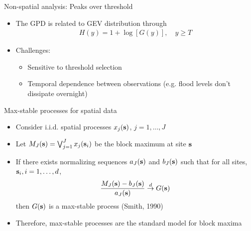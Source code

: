 \documentclass{beamer}
\begin{document}
\begin{frame}{Non-spatial analysis: Peaks over threshold}
  \begin{itemize} \setlength{\itemsep}{1em}
    \item The GPD is related to GEV distribution through
    \begin{align*}
      H(y) = 1 + \log[G(y)], \quad y \ge T
    \end{align*}
    \item Challenges: \vspace{0.5em}
    \begin{itemize} \setlength{\itemsep}{0.5em}
      \item Sensitive to threshold selection
      \item Temporal dependence between observations (e.g. flood levels don't dissipate overnight)
    \end{itemize}
  \end{itemize}
\end{frame}

\begin{frame}{Max-stable processes for spatial data}
  \begin{itemize} \setlength{\itemsep}{1em}
    \item Consider i.i.d. spatial processes $x_j(\mbox{\bf s})$, $j = 1, \ldots, J$
    \item Let $M_J(\mbox{\bf s}) = \bigvee_{j=1}^J x_j(\mbox{\bf s}_i)$ be the block maximum at site $\mbox{\bf s}$
    \item If there exists normalizing sequences $a_J(\mbox{\bf s})$ and $b_J(\mbox{\bf s})$ such that for all sites, $\mbox{\bf s}_i, i = 1, \ldots, d$,
    \begin{align*}
      \frac{M_J(\mbox{\bf s}) - b_J(\mbox{\bf s})}{a_J(\mbox{\bf s})} \stackrel{d}{\rightarrow} G(\mbox{\bf s})
    \end{align*}
    then $G(\mbox{\bf s})$ is a max-stable process (Smith, 1990)
    \item Therefore, max-stable processes are the standard model for block maxima
  \end{itemize}
\end{frame}
\end{document}
